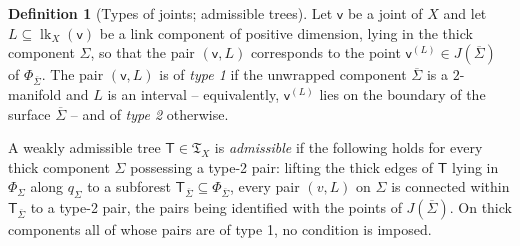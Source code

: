 \documentclass[reqno]{amsart}
\theoremstyle{definition}
\newtheorem{definition}[theorem]{Definition}
\newcommand\frT{\mathfrak{T}}
\newcommand\sfT{\mathsf{T}}
\newcommand\sfv{\mathsf{v}}
\renewcommand{\bar}{\overline}
\DeclareMathOperator{\lk}{lk}
\numberwithin{equation}{section}
\begin{document}
\begin{definition}[Types of joints; admissible trees]
\label{def:admissible-tree}
Let \(\sfv\) be a joint of \(X\) and let \(L\subseteq\lk_X(\sfv)\) be
a link component of positive dimension, lying in the thick
component \(\Sigma\), so that the pair \((\sfv,L)\) corresponds to
the point \(\sfv^{(L)}\in J(\bar{\Sigma})\) of
\(\Phi_{\bar{\Sigma}}\). The pair \((\sfv,L)\) is of
\emph{type 1} if the unwrapped component \(\bar{\Sigma}\)
is a \(2\)-manifold and \(L\) is an interval -- equivalently,
\(\sfv^{(L)}\) lies on the boundary of the surface
\(\bar{\Sigma}\) -- and of \emph{type 2} otherwise.

A weakly admissible tree \(\sfT\in\frT_X\) is \emph{admissible} if the following holds for every thick component
\(\Sigma\) possessing a type-2 pair: lifting the thick edges of
\(\sfT\) lying in \(\Phi_\Sigma\) along \(q_\Sigma\) to a
subforest
\(\sfT_{\bar{\Sigma}}\subseteq\Phi_{\bar{\Sigma}}\),
every pair \((v,L)\) on \(\Sigma\) is connected within
\(\sfT_{\bar{\Sigma}}\) to a type-2 pair, the pairs being
identified with the points of \(J(\bar{\Sigma})\). On
thick components all of whose pairs are of type 1, no condition
is imposed.
\end{definition}
\end{document}
